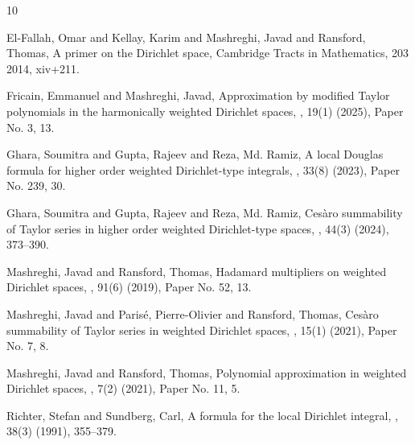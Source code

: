 \documentclass[12pt,reqno]{amsart}
\begin{document}
	\begin{center}
\begin{thebibliography}{10}

El-Fallah, Omar and Kellay, Karim and Mashreghi, Javad and Ransford, Thomas,
\newblock A primer on the {D}irichlet space,
\newblock Cambridge Tracts in Mathematics, 203 {2014}, xiv+211.

Fricain, Emmanuel and Mashreghi, Javad,
\newblock Approximation by modified {T}aylor polynomials in the
harmonically weighted {D}irichlet spaces,
, 19(1) (2025), Paper No. 3, 13.

Ghara, Soumitra and Gupta, Rajeev and Reza, Md. Ramiz,
\newblock A local {D}ouglas formula for higher order weighted
{D}irichlet-type integrals,
, 33(8) (2023), Paper No. 239, 30.

Ghara, Soumitra and Gupta, Rajeev and Reza, Md. Ramiz,
\newblock Ces\`aro summability of {T}aylor series in higher order
weighted {D}irichlet-type spaces,
, 44(3) (2024), 373--390.

Mashreghi, Javad and Ransford, Thomas,
\newblock Hadamard multipliers on weighted {D}irichlet spaces,
, 91(6) (2019), Paper No. 52, 13.

Mashreghi, Javad and Paris\'e, Pierre-Olivier and Ransford, Thomas,
\newblock Ces\`aro summability of {T}aylor series in weighted
{D}irichlet spaces,
, 15(1) (2021), Paper No. 7, 8.

Mashreghi, Javad and Ransford, Thomas,
\newblock Polynomial approximation in weighted {D}irichlet spaces,
, 7(2) (2021), Paper No. 11, 5.

Richter, Stefan and Sundberg, Carl,
\newblock A formula for the local {D}irichlet integral,
, 38(3) (1991), 355--379.

\end{thebibliography}
\end{center}
\end{document}
